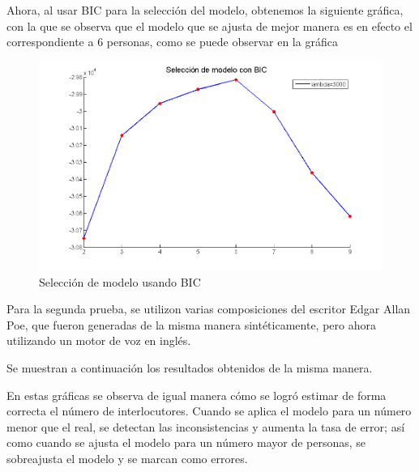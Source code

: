 Ahora, al usar BIC para la selección del modelo, obtenemos la siguiente gráfica, con la que se observa que el modelo que se ajusta de mejor manera es en efecto el correspondiente a 6 personas, como se puede observar en la gráfica 
\begin{figure}[bth]
  \centerline
  {\includegraphics[width=0.9\linewidth]{gfx/chap5/cuerv-0}} \quad
  \caption{Selección de modelo usando BIC}
  \label{fig:cald-0}
\end{figure}


Para la segunda prueba, se utilizon varias composiciones del escritor Edgar Allan Poe, que fueron generadas de la misma manera sintéticamente, pero ahora utilizando un motor de voz en inglés.

Se muestran a continuación los resultados obtenidos de la misma manera.

En estas gráficas se observa de igual manera cómo se logró estimar de forma correcta el número de interlocutores. Cuando se aplica el modelo para un número menor que el real, se detectan las inconsistencias y aumenta la tasa de error; así como cuando se ajusta el modelo para un número mayor de personas, se sobreajusta el modelo y se marcan como errores.



